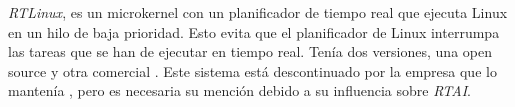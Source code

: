 
\textit{RTLinux}, es un microkernel con un planificador de tiempo real que ejecuta Linux en un hilo de baja prioridad. Esto evita que el planificador de Linux interrumpa las tareas que se han de ejecutar en tiempo real. Tenía dos versiones, una open source y otra comercial \cite{Buttazzo2024}. Este sistema está descontinuado por la empresa que lo mantenía \cite{EmbLogic2011}, pero es necesaria su mención debido a su influencia sobre \textit{RTAI}.
